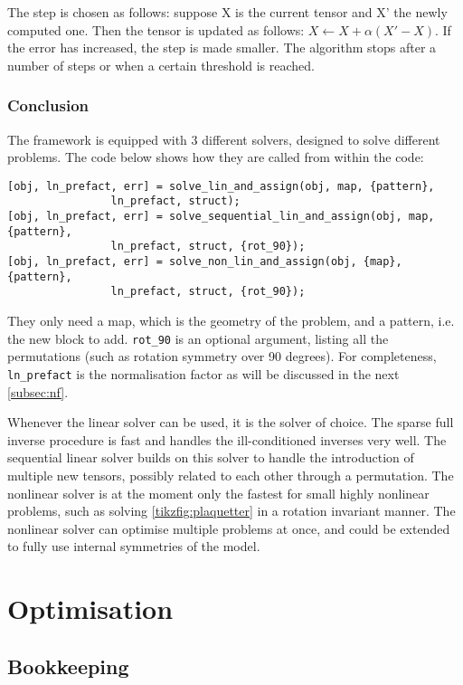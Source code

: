 The step is chosen as follows: suppose X is the current tensor and X' the newly computed one. Then the tensor is updated as follows: $X \leftarrow X + \alpha (X'-X)$. If the error has increased, the step is made smaller. The algorithm stops after a number of steps or when a certain threshold is reached.

\subsubsection{Conclusion}

The framework is equipped with 3 different solvers, designed to solve different problems. The code below shows how they are called from within the code:
\begin{verbatim}
[obj, ln_prefact, err] = solve_lin_and_assign(obj, map, {pattern}, 
                ln_prefact, struct);
[obj, ln_prefact, err] = solve_sequential_lin_and_assign(obj, map, {pattern},
                ln_prefact, struct, {rot_90});
[obj, ln_prefact, err] = solve_non_lin_and_assign(obj, {map}, {pattern}, 
                ln_prefact, struct, {rot_90});
\end{verbatim}
They only need a map, which is the geometry of the problem, and a pattern, i.e. the new block to add. \verb#rot_90# is an optional argument, listing all the permutations (such as rotation symmetry over 90 degrees). For completeness, \verb#ln_prefact# is the normalisation factor as will be discussed in the next \cref{subsec:nf}.

Whenever the linear solver can be used, it is the solver of choice. The sparse full inverse procedure is fast and handles the ill-conditioned inverses very well. The sequential linear solver builds on this solver to handle the introduction of multiple new tensors, possibly related to each other through a permutation. The nonlinear solver is at the moment only the fastest for small highly nonlinear problems, such as solving \cref{tikzfig:plaquetter} in a rotation invariant manner. The nonlinear solver can optimise multiple problems at once, and could be extended to fully use internal symmetries of the model.

\section{Optimisation}

\subsection{Bookkeeping}

